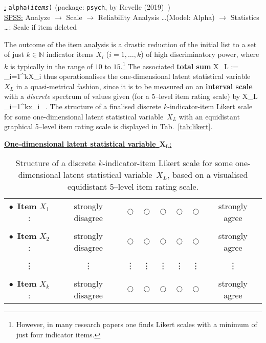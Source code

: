 \medskip
\noindent
\underline{\R:} \texttt{alpha({\it items\/})} (package:
\texttt{psych}, by Revelle (2019)~) \\
\underline{SPSS:} Analyze $\rightarrow$ Scale $\rightarrow$ 
Reliability Analysis \ldots (Model: Alpha) $\rightarrow$ 
Statistics \ldots: Scale if item deleted

\medskip
\noindent
The outcome of the item analysis is a drastic reduction of the 
initial list to a set of just $k \in \mathbb{N}$ indicator items 
$X_{i}$ ($i=1,\ldots,k$) of high discriminatory power, where $k$ 
is typically in the range of $10$ to $15$.\footnote{However, in 
many research papers one finds Likert scales with a minimum of 
just four indicator items.} The associated \textbf{total sum}
%
\be 
X_{L} := \sum_{i=1}^{k}X_{i}
\ee
%
thus operationalises the one-dimensional latent statistical 
variable~$X_{L}$ in a quasi-metrical fashion, since it is to be 
measured on an \textbf{interval scale} with a \textit{discrete} 
spectrum of values given (for a 5--level item rating scale) by
%
\be
X_{L} \mapsto \sum_{i=1}^{k}x_{i} \in \left[1k,5k\right] \ .
\ee
%
The structure of a finalised discrete $k$-indicator-item Likert 
scale for some one-dimensional latent statistical variable~$X_{L}$ 
with an equidistant graphical 5--level item rating scale is 
displayed in Tab.~\ref{tab:likert}.
%
\begin{table}

\underline{\textbf{One-dimensional latent statistical
variable}~$\boldsymbol{X_{L}}$:}
%
\begin{center}
\begin{tabular}[!htb]{cccccccc}
$\bullet$\ \textbf{Item} $X_{1}$: &
strongly disagree & $\bigcirc$\quad\quad\mbox{} 
& $\bigcirc$\quad\quad\mbox{} & $\bigcirc$\quad\quad\mbox{} & 
$\bigcirc$\quad\quad\mbox{} & $\bigcirc$ & strongly agree \\ \\
$\bullet$\ \textbf{Item} $X_{2}$: &
strongly disagree & $\bigcirc$\quad\quad\mbox{} 
& $\bigcirc$\quad\quad\mbox{} & $\bigcirc$\quad\quad\mbox{} & 
$\bigcirc$\quad\quad\mbox{} & $\bigcirc$ & strongly agree \\ \\
\vdots & \vdots & \vdots\quad\quad\mbox{} & 
\vdots\quad\quad\mbox{} & \vdots\quad\quad\mbox{} & 
\vdots\quad\quad\mbox{} & \vdots & \vdots\\ \\
$\bullet$\ \textbf{Item} $X_{k}$: & 
strongly disagree & $\bigcirc$\quad\quad\mbox{} 
& $\bigcirc$\quad\quad\mbox{} & $\bigcirc$\quad\quad\mbox{} & 
$\bigcirc$\quad\quad\mbox{} & $\bigcirc$ & strongly agree
\end{tabular}
\end{center}
\caption{Structure of a discrete $k$-indicator-item Likert scale 
for some one-dimensional latent statistical variable~$X_{L}$, 
based on a visualised equidistant 5--level item rating scale.}
\end{table}
%

